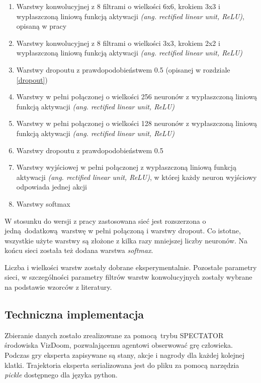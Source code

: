\begin{enumerate}
\item{Warstwy konwolucyjnej z 8 filtrami o wielkości 6x6, krokiem 3x3 i wypłaszczoną liniową funkcją aktywacji \textit{(ang. rectified linear unit, ReLU)}, opisaną w pracy \cite{AISTATS2011_GlorotBB11}}
\item{Warstwy konwolucyjnej z 8 filtrami o wielkości 3x3, krokiem 2x2 i wypłaszczoną liniową funkcją aktywacji \textit{(ang. rectified linear unit, ReLU)}}
\item{Warstwy dropoutu z prawdopodobieństwem 0.5 (opisanej w rozdziale \ref{dropout})} 
\item{Warstwy w pełni połączonej o wielkości 256 neuronów z wypłaszczoną liniową funkcją aktywacji \textit{(ang. rectified linear unit, ReLU)}}
\item{Warstwy w pełni połączonej o wielkości 128 neuronów z wypłaszczoną liniową funkcją aktywacji \textit{(ang. rectified linear unit, ReLU)}}
\item{Warstwy dropoutu z prawdopodobieństwem 0.5}
\item{Warstwy wyjściowej w pełni połączonej z wypłaszczoną liniową funkcją aktywacji \textit{(ang. rectified linear unit, ReLU)}, w której każdy neuron wyjściowy odpowiada jednej akcji}
\item{Warstwy softmax}
\end{enumerate}

W stosunku do wersji z pracy \cite{DBLP:journals/corr/KempkaWRTJ16} zastosowana sieć jest rozszerzona o jedną dodatkową warstwę w pełni połączoną i warstwy dropout. Co istotne, wszystkie użyte warstwy są złożone z kilka razy mniejszej liczby neuronów. Na końcu sieci została też dodana warstwa \textit{softmax}.

Liczba i wielkości warstw zostały dobrane eksperymentalnie. Pozostałe parametry sieci, w szczególności parametry filtrów warstw konwolucyjnych zostały wybrane na podstawie wzorców z literatury.

\subsection{Techniczna implementacja} \label{behavioral_cloning_tech}

Zbieranie danych zostało zrealizowane za pomocą trybu SPECTATOR środowiska VizDoom, pozwalającemu agentowi obserwować grę człowieka. Podczas gry eksperta zapisywane są stany, akcje i nagrody dla każdej kolejnej klatki. Trajektoria eksperta serializowana jest do pliku za pomocą narzędzia \textit{pickle} dostępnego dla języka python.

